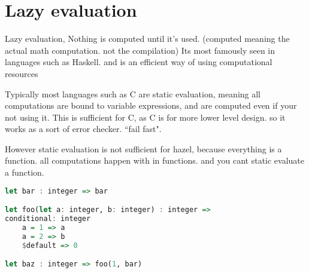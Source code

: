 \documentclass{article}
\begin{document}





     


\section{Lazy evaluation}

Lazy evaluation, Nothing is computed until it's used.
(computed meaning the actual math computation. not the compilation)
Its most famously seen in languages such as Haskell. and is an efficient way of using computational resources 

Typically most languages such as C are static evaluation, meaning all computations are bound to variable expressions, and are computed even if your not using it. This is sufficient for C, as C is for more lower level design. so it works as a sort of error checker. ``fail fast". 

However static evaluation is not sufficient for hazel, because everything is a function. all computations happen with in functions. and you cant static evaluate a function. 

\begin{lstlisting}[language=Haskell, caption=consider these 2 functions. bar a recursive function and foo that takes parameters a and b and compares a results]
let bar : integer => bar

let foo(let a: integer, b: integer) : integer => 
conditional: integer 
    a = 1 => a
    a = 2 => b
    $default => 0

let baz : integer => foo(1, bar)

\end{lstlisting}
\end{document}
